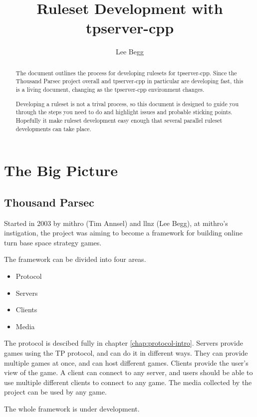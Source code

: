 \documentclass[a4paper,11pt]{report}
\title{Ruleset Development with tpserver-cpp}
\author{Lee Begg}
\begin{document}
\maketitle

\tableofcontents

\begin{abstract}
The document outlines the process for developing rulesets for tpserver-cpp. Since the Thousand Parsec project overall and tpserver-cpp in particular are developing fast, this is a living document, changing as the tpserver-cpp environment changes.

Developing a ruleset is not a trival process, so this document is designed to guide you through the steps
you need to do and highlight issues and probable sticking points. Hopefully it make ruleset development easy enough that several parallel ruleset developments can take place.
\end{abstract}

\part{The Big Picture}
\label{part:intro}

\chapter{Thousand Parsec}
\label{chap:tp}
Started in 2003 by mithro (Tim Annsel) and llnz (Lee Begg), at mithro's instigation, the project was aiming to become a framework for building online turn base space strategy games.


The framework can be divided into four areas.
\begin{itemize}
 \item Protocol
 \item Servers
 \item Clients
 \item Media
\end{itemize}

The protocol is descibed fully in chapter \ref{chap:protocol-intro}. Servers provide games using the TP protocol, and can do it in different ways. They can provide multiple games at once, and can host different games. Clients provide the user's view of the game. A client can connect to any server, and users should be able to use multiple different clients to connect to any game. The media collected by the project can be used by any game.

The whole framework is under development.
\end{document}
